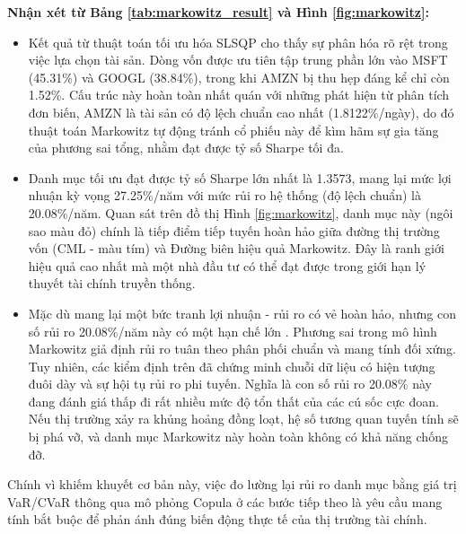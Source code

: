 \begin{flushleft}
\textbf{Nhận xét từ Bảng \ref{tab:markowitz_result} và Hình \ref{fig:markowitz}:}
\begin{itemize}
    \item Kết quả từ thuật toán tối ưu hóa SLSQP cho thấy sự phân hóa rõ rệt trong việc lựa chọn tài sản. Dòng vốn được ưu tiên tập trung phần lớn vào MSFT (45.31\%) và GOOGL (38.84\%), trong khi AMZN bị thu hẹp đáng kể chỉ còn 1.52\%. Cấu trúc này hoàn toàn nhất quán với những phát hiện từ phân tích đơn biến, AMZN là tài sản có độ lệch chuẩn cao nhất (1.8122\%/ngày), do đó thuật toán Markowitz tự động tránh cổ phiếu này để kìm hãm sự gia tăng của phương sai tổng, nhằm đạt được tỷ số Sharpe tối đa.
    \item Danh mục tối ưu đạt được tỷ số Sharpe lớn nhất là 1.3573, mang lại mức lợi nhuận kỳ vọng 27.25\%/năm với mức rủi ro hệ thống (độ lệch chuẩn) là 20.08\%/năm. Quan sát trên đồ thị Hình \ref{fig:markowitz}, danh mục này (ngôi sao màu đỏ) chính là tiếp điểm tiếp tuyến hoàn hảo giữa đường thị trường vốn (CML - màu tím) và Đường biên hiệu quả Markowitz. Đây là ranh giới hiệu quả cao nhất mà một nhà đầu tư có thể đạt được trong giới hạn lý thuyết tài chính truyền thống.
    \item Mặc dù mang lại một bức tranh lợi nhuận - rủi ro có vẻ hoàn hảo, nhưng con số rủi ro 20.08\%/năm này có một hạn chế lớn . Phương sai trong mô hình Markowitz giả định rủi ro tuân theo phân phối chuẩn và mang tính đối xứng. Tuy nhiên, các kiểm định trên đã chứng minh chuỗi dữ liệu có hiện tượng đuôi dày và sự hội tụ rủi ro phi tuyến. Nghĩa là con số rủi ro 20.08\% này đang đánh giá thấp đi rất nhiều mức độ tổn thất của các cú sốc cực đoan. Nếu thị trường xảy ra khủng hoảng đồng loạt, hệ số tương quan tuyến tính sẽ bị phá vỡ, và danh mục Markowitz này hoàn toàn không có khả năng chống đỡ.
\end{itemize}
Chính vì khiếm khuyết cơ bản này, việc đo lường lại rủi ro danh mục bằng giá trị VaR/CVaR thông qua mô phỏng Copula ở các bước tiếp theo là yêu cầu mang tính bắt buộc để phản ánh đúng biến động thực tế của thị trường tài chính.
\end{flushleft}
